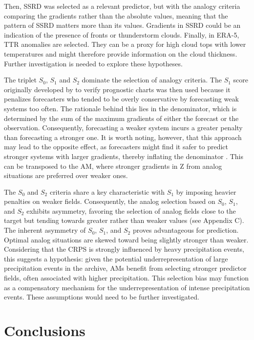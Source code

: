 \documentclass[draft]{agujournal2019}
\begin{document}
Then, SSRD was selected as a relevant predictor, but with the analogy criteria comparing the gradients rather than the absolute values, meaning that the pattern of SSRD matters more than its values. Gradients in SSRD could be an indication of the presence of fronts or thunderstorm clouds. Finally, in ERA-5, TTR anomalies are selected. They can be a proxy for high cloud tops with lower temperatures and might therefore provide information on the cloud thickness. Further investigation is needed to explore these hypotheses.

The triplet $S_{0}$, $S_{1}$ and $S_{2}$ dominate the selection of analogy criteria. The $S_{1}$ score originally developed by  to verify prognostic charts was then used because it penalizes forecasters who tended to be overly conservative by forecasting weak systems too often. The rationale behind this lies in the denominator, which is determined by the sum of the maximum gradients of either the forecast or the observation. Consequently, forecasting a weaker system incurs a greater penalty than forecasting a stronger one. It is worth noting, however, that this approach may lead to the opposite effect, as forecasters might find it safer to predict stronger systems with larger gradients, thereby inflating the denominator \cite{Thompson1972}. This can be transposed to the AM, where stronger gradients in Z from analog situations are preferred over weaker ones.

The $S_{0}$ and $S_{2}$ criteria share a key characteristic with $S_{1}$ by imposing heavier penalties on weaker fields. Consequently, the analog selection based on $S_{0}$, $S_{1}$, and $S_{2}$ exhibits asymmetry, favoring the selection of analog fields close to the target but tending towards greater rather than weaker values (see Appendix C). The inherent asymmetry of $S_{0}$, $S_{1}$, and $S_{2}$ proves advantageous for prediction. Optimal analog situations are skewed toward being slightly stronger than weaker. Considering that the CRPS is strongly influenced by heavy precipitation events, this suggests a hypothesis: given the potential underrepresentation of large precipitation events in the archive, AMs benefit from selecting stronger predictor fields, often associated with higher precipitation. This selection bias may function as a compensatory mechanism for the underrepresentation of intense precipitation events. These assumptions would need to be further investigated.


\section{Conclusions}
\label{conclusions}
\end{document}
